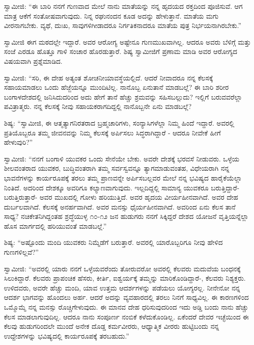  ಸ್ವಾಮೀಜಿ: “ಈ ಬಾರಿ ನನಗೆ ಗುಣವಾದ ಮೇಲೆ ನಾನು ಮಾತೆಯನ್ನು ನನ್ನ ಹೃದಯದ ರಕ್ತದಿಂದ ಪೂಜಿಸುವೆ. ಆಗ ಮಾತ್ರ ಆಕೆಗೆ ಸಂತೋಷವಾಗುವುದು. ನಿನ್ನ ರಘುನಂದನ ಕೂಡ ಅದನ್ನು ಹೇಳುತ್ತಾನೆ. ಮಾತೆಯ ಮಗು ವೀರನಾಗಬೇಕು. ವ್ಯಥೆ, ದುಃಖ, ಸಾವುಗಳಿಗೀಡಾದರೂ ನಿರ್ಗತಿಕನಾದರೂ ಮಾತೆಯ ಪುತ್ರ ನಿರ್ಭಯನಾಗಿರಬೇಕು.” 

 ಸ್ವಾಮೀಜಿ ಈಗ ಮಠದಲ್ಲೇ ಇದ್ದಾರೆ. ಅವರ ಆರೋಗ್ಯ ಅಷ್ಟೇನೂ ಗುಣಮುಖವಾಗಿಲ್ಲ. ಆದರೂ ಅವರು ಬೆಳಿಗ್ಗೆ ಮತ್ತು ಸಂಜೆ ಎರಡೂ ಹೊತ್ತೂ ಗಾಳಿ ಸಂಚಾರ ಹೊರಡುತ್ತಾರೆ. ಶಿಷ್ಯ ಸ್ವಾಮೀಜಿಗೆ ಪ್ರಣಾಮ ಮಾಡಿ ಅವರ ಆರೋಗ್ಯದ ವಿಷಯವಾಗಿ ಪ್ರಶ್ನೆಮಾಡಿದ. 

 ಸ್ವಾಮೀಜಿ: “ಸರಿ, ಈ ದೇಹ ಅತ್ಯಂತ ಶೋಚನೀಯಾವಸ್ಥೆಯಲ್ಲಿದೆ. ಆದರೆ ನೀವಾದರೂ ನನ್ನ ಕೆಲಸಕ್ಕೆ ಸಹಾಯಮಾಡಲು ಒಂದು ಹೆಜ್ಜೆಯನ್ನೂ ಮುಂದಿಟಿಲ್ಲ. ನಾನೊಬ್ಬ ಏನುತಾನೆ ಮಾಡಬಲ್ಲೆ? ಈ ಬಾರಿ ಶರೀರ ಬಂಗಾಳದೇಶದಲ್ಲಿ ಜನಿಸಿದುದರಿಂದ ಅದು ಹೇಗೆ ತಾನೆ ಹೆಚ್ಚು ಶ್ರಮವನ್ನು ಸಹಿಸಬಲ್ಲುದು? ಇಲ್ಲಿಗೆ ಬರುವವರೆಲ್ಲಾ ಪವಿತ್ರಾತ್ಮರು. ನನ್ನ ಕೆಲಸಕ್ಕೆ ನೀವು ಸಹಾಯಕರಾಗದಿದ್ದಲ್ಲಿ ನಾನೊಬ್ಬನೇ ಏನು ಮಾಡಬಲ್ಲೆ? 

 ಶಿಷ್ಯ: “ಸ್ವಾಮೀಜಿ, ಈ ಆತ್ಮತ್ಯಾಗನಿರತರಾದ ಬ್ರಹ್ಮಚಾರಿಗಳು, ಸಂನ್ಯಾಸಿಗಳೆಲ್ಲಾ ನಿಮ್ಮ ಹಿಂದೆ ಇದ್ದಾರೆ. ಅವರಲ್ಲಿ ಪ್ರತಿಯೊಬ್ಬರೂ ತಮ್ಮ ಜೀವನವನ್ನು ನಿಮ್ಮ ಕೆಲಸಕ್ಕೆ ಅರ್ಪಿಸಲು ಸಿದ್ಧರಾಗಿದ್ದಾರೆ - ಆದರೂ ನೀವೇಕೆ ಹೀಗೆ ಹೇಳುವುರಿ?” 

 ಸ್ವಾಮೀಜಿ: “ನನಗೆ ಬಂಗಾಳಿ ಯುವಕರ ಒಂದು ಸೇನೆಯೇ ಬೇಕು. ಅವರೇ ದೇಶಕ್ಕೆ ಭರವಸೆ ನೀಡುವರು. ಒಳ್ಳೆಯ ಶೀಲವಂತರಾದ ಯುವಕರ, ಬುದ್ಧಿವಂತರಾಗಿ ತಮ್ಮ ಸರ್ವಸ್ವವನ್ನೂ ತ್ಯಾಗಮಾಡುವಂತಹ, ವಿಧೇಯರಾಗಿ ನನ್ನ ಭಾವನೆಗಳನ್ನು ಕಾರ್ಯರೂಪಕ್ಕೆ ತರಲು ತಮ್ಮ ಪ್ರಾಣವನ್ನೇ ಅರ್ಪಿಸಬಲ್ಲವರ ಮೇಲೆ ನನ್ನ ಭವಿಷ್ಯದ ಹಾರೈಕೆಯೆಲ್ಲಾ ನಿಂತಿದೆ. ಅದರಿಂದ ದೇಶಕ್ಕೂ ಅವರಿಗೂ ಕಲ್ಯಾಣವಾಗುವುದು. ಇಲ್ಲದಿದ್ದಲ್ಲಿ ಸಾಮಾನ್ಯ ಯುವಕರೂ ಬರುತ್ತಿದ್ದಾರೆ- ಬರುತ್ತಿರುತ್ತಾರೆ- ಅವರ ಮುಖದಲ್ಲಿ ಗೋಳು ಹರಿಯುತ್ತಿದೆ. ಅವರ ಹೃದಯ ವೀರ್ಯಹೀನವಾಗಿದೆ. ಅವರ ದೇಹ ದುರ್ಬಲವಾಗಿದೆ. ಕೆಲಸಕ್ಕೆ ಅನರ್ಹವಾಗಿದೆ. ಅವರ ಮನಸ್ಸು ಧೈರ್ಯಹೀನವಾಗಿದೆ. ಅವರಿಂದ ಏನು ಕೆಲಸ ತಾನೆ ಸಾಧ್ಯ? ನಚಿಕೇತನಿಗಿದ್ದಂತಹ ಶ್ರದ್ಧೆಯುಳ್ಳ ೧೦-೧೨ ಜನ ಹುಡುಗರು ನನಗೆ ಸಿಕ್ಕಿದ್ದರೆ ದೇಶದ ಯೋಜನೆ ವೃತ್ತಿಯನ್ನೆಲ್ಲಾ ಹೊಸ ಮಾರ್ಗದಲ್ಲಿ ಹರಿಯುವಂತೆ ಮಾಡಬಲ್ಲೆ.” 

 ಶಿಷ್ಯ: “ಅಷ್ಟೊಂದು ಮಂದಿ ಯುವಕರು ನಿಮ್ಮೆಡೆಗೆ ಬರುತ್ತಾರೆ. ಅವರಲ್ಲಿ ಯಾರೊಬ್ಬರಿಗೂ ನೀವು ಹೇಳಿದ ಗುಣಗಳಿಲ್ಲವೆ?” 

 ಸ್ವಾಮೀಜಿ: “ಅವರಲ್ಲಿ ಯಾರು ನನಗೆ ಒಳ್ಳೆಯವರೆಂದು ತೋರುವರೋ ಅವರಲ್ಲಿ ಕೆಲವರು ಮದುವೆಯ ಬಂಧನಕ್ಕೆ ಸಿಲುಕಿದ್ದಾರೆ. ಕೆಲವರು ಪ್ರಾಪಂಚಿಕ ಹೆಸರು, ಕೀರ್ತಿ, ಐಶ್ವರ್ಯಕ್ಕೆ ತಮ್ಮನ್ನು ಮಾರಿಕೊಂಡಿದ್ದಾರೆ-, ಕೆಲವರು ನಿಶ್ಯಕ್ತರು. ಉಳಿದವರು, ಅವರೇ ಹೆಚ್ಚು ಮಂದಿ, ಯಾವ ಉತ್ತಮ ಆದರ್ಶಗಳನ್ನು ಪಡೆಯಲು ಯೋಗ್ಯರಲ್ಲ. ನೀನೇನೋ ನನ್ನ ಆದರ್ಶ ಭಾಗವನ್ನು ಹೊಂದಲು ಅರ್ಹ. ಆದರೆ ಅದನ್ನು ವ್ಯವಹಾರದಲ್ಲಿ ತರಲು ನಿನಗೆ ಸಾಧ್ಯವಿಲ್ಲ. ಈ ಕಾರಣಗಳಿಂದ ಒಮ್ಮೊಮ್ಮೆ ನನ್ನ ಮನಸ್ಸು ರೊಚ್ಚಿಗೇಳುವುದು. ಈ ಮಾನವ ದೇಹ ಧರಿಸುವುದರಿಂದ ಇದು ಅಡ್ಡಿ ಬಂದು ನಾನು ಹೆಚ್ಚು ಕೆಲಸ ಮಾಡಲಾಗುವುದಿಲ್ಲ. ಆದರೂ ನಾನು ಸಂಪೂರ್ಣ ನಂಬಿಕೆ ಕಳೆದುಕೊಂಡಿಲ್ಲ. ಏಕೆಂದರೆ ದೇವರ ಇಚ್ಛೆಯಿಂದ ಈ ಕೆಲವು ಹುಡುಗರಿಂದಲೇ ಮುಂದೆ ಅನೇಕ ದೊಡ್ಡ ಕರ್ಮವೀರರು, ಆಧ್ಯಾತ್ಮಿಕ ವೀರರು ಹುಟ್ಟಿಬಂದು ನನ್ನ ಉದ್ದೇಶಗಳನ್ನು ಭವಿಷ್ಯದಲ್ಲಿ ಕಾರ್ಯರೂಪಕ್ಕೆ ತರಬಹುದು.” 

